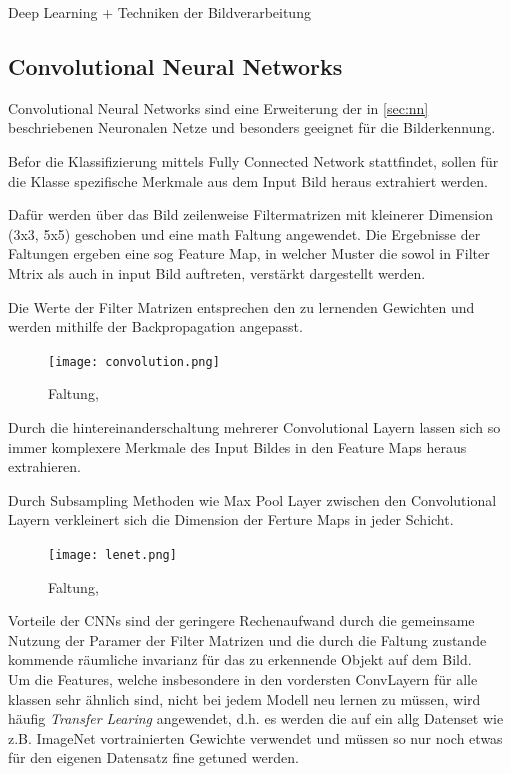 Deep Learning + Techniken der Bildverarbeitung

\subsection{Convolutional Neural Networks}\label{subsec:cnn}

Convolutional Neural Networks sind eine Erweiterung 
der in \ref{sec:nn} beschriebenen Neuronalen Netze 
und besonders geeignet für die Bilderkennung.

Befor die Klassifizierung mittels Fully Connected Network 
stattfindet, sollen für die Klasse spezifische Merkmale 
aus dem Input Bild heraus extrahiert werden.

Dafür werden über das Bild zeilenweise Filtermatrizen mit kleinerer Dimension
(3x3, 5x5) geschoben und eine math Faltung angewendet.
Die Ergebnisse der Faltungen ergeben eine sog Feature Map, in welcher 
Muster die sowol in Filter Mtrix als auch in input Bild auftreten, verstärkt 
dargestellt werden.

Die Werte der Filter Matrizen entsprechen den zu lernenden Gewichten 
und werden mithilfe der Backpropagation angepasst.

\begin{figure}[htb]
    \centering
    \label{fig:conv}
    \texttt{[image: convolution.png]}
    \caption{Faltung, \cite{researcherSimpleIntroductionConvolutional2019}}
\end{figure}



Durch die hintereinanderschaltung mehrerer Convolutional Layern 
lassen sich so immer komplexere Merkmale des Input Bildes in den 
Feature Maps heraus extrahieren.

Durch Subsampling Methoden wie Max Pool Layer zwischen den Convolutional
Layern verkleinert sich die Dimension der Ferture Maps in jeder Schicht.


\begin{figure}[htb]
    \centering
    \label{fig:lenet}
    \texttt{[image: lenet.png]}
    \caption{Faltung, \cite{lecunGradientBasedLearningApplied1998}}
\end{figure}


Vorteile der CNNs sind der geringere Rechenaufwand durch die gemeinsame 
Nutzung der Paramer der Filter Matrizen und die durch die 
Faltung zustande kommende räumliche invarianz für das zu erkennende 
Objekt auf dem Bild.
\\
Um die Features, welche insbesondere in den vordersten ConvLayern für 
alle klassen sehr ähnlich sind, nicht bei jedem Modell
neu lernen zu müssen, wird häufig \textit{Transfer Learing} angewendet, 
d.h. es werden die auf ein allg Datenset wie z.B. ImageNet vortrainierten
Gewichte verwendet und müssen so nur noch etwas für den eigenen Datensatz 
fine getuned werden.


